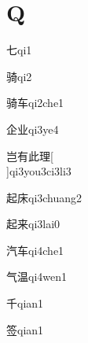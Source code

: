 ﻿%
\section*{Q}

\begin{verbete}[2]{七}{qi1}
\end{verbete}

\begin{verbete}[11]{骑}{qi2}
\end{verbete}

\begin{verbete}[11;4]{骑车}{qi2che1}
\end{verbete}

\begin{verbete}[6;5]{企业}{qi3ye4}
\end{verbete}

\begin{verbete}[6;6;6;11]{岂有此理}[\\]{qi3you3ci3li3}
\end{verbete}

\begin{verbete}[10;7]{起床}{qi3chuang2}
\end{verbete}

\begin{verbete}[10;7]{起来}{qi3lai0}
\end{verbete}

\begin{verbete}[7;4]{汽车}{qi4che1}
\end{verbete}

\begin{verbete}[4;12]{气温}{qi4wen1}
\end{verbete}

\begin{verbete}[3]{千}{qian1}
\end{verbete}

\begin{verbete}[13]{签}{qian1}
\end{verbete}

